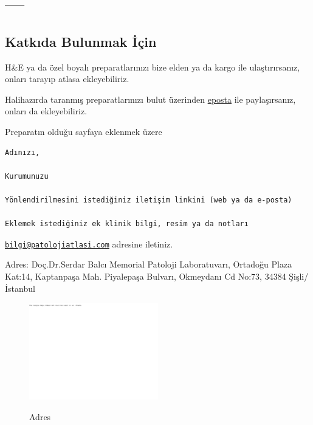 \documentclass[
  letterpaper,
  paper=6in:9in,
  pagesize=pdftex,
  headinclude=on,
  footinclude=on,
  12pt]{scrbook}
\newlength{\cslhangindent}
\newlength{\cslentryspacingunit} %
\newenvironment{CSLReferences}[2] %
 {%
  \setlength{\parindent}{0pt}
  \ifodd #1
  \let\oldpar\par
  \def\par{\hangindent=\cslhangindent\oldpar}
  \fi
  \setlength{\parskip}{#2\cslentryspacingunit}
 }%
 {}
\begin{document}

\hypertarget{refs}{}
\begin{CSLReferences}{0}{0}
\end{CSLReferences}

\part{---}

\cleardoublepage
{}
{}
\appendix

\hypertarget{sec-katki}{%
\chapter{Katkıda Bulunmak İçin}\label{sec-katki}}

H\&E ya da özel boyalı preparatlarınızı bize elden ya da kargo ile
ulaştırırsanız, onları tarayıp atlasa ekleyebiliriz.

Halihazırda taranmış preparatlarınızı bulut üzerinden
\href{mailto:bilgi@patolojiatlasi.com}{eposta} ile paylaşırsanız, onları
da ekleyebiliriz.

Preparatın olduğu sayfaya eklenmek üzere

\begin{verbatim}
Adınızı,

Kurumunuzu

Yönlendirilmesini istediğiniz iletişim linkini (web ya da e-posta)

Eklemek istediğiniz ek klinik bilgi, resim ya da notları
\end{verbatim}

\href{mailto:bilgi@patolojiatlasi.com}{\nolinkurl{bilgi@patolojiatlasi.com}}
adresine iletiniz.

Adres: Doç.Dr.Serdar Balcı Memorial Patoloji Laboratuvarı, Ortadoğu
Plaza Kat:14, Kaptanpaşa Mah. Piyalepaşa Bulvarı, Okmeydanı Cd No:73,
34384 Şişli/İstanbul

\begin{figure}[H]

{\centering 

\href{https://www.google.com/maps/embed?pb=!1m14!1m8!1m3!1d12033.28963318435!2d28.9735333!3d41.0619447!3m2!1i1024!2i768!4f13.1!3m3!1m2!1s0x0\%3A0x5b15447cefe51a4e!2sMemorial\%20Patoloji\%20Laboratuvar\%C4\%B1!5e0!3m2!1sen!2str!4v1646745650518!5m2!1sen!2str}{\includegraphics[width=0.5\textwidth,height=\textheight]{./screenshots/katki_screenshot.png}}

}

\caption{Adres}

\end{figure}
\end{document}
